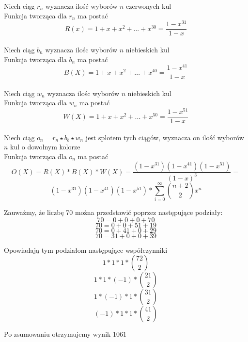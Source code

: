 \documentclass{mwart}
\begin{document}
\begin{mdframed}
    Niech ciąg $r_n$ wyznacza ilość wyborów $n$ czerwonych kul\\
    Funkcja tworząca dla $r_n$ ma postać \\
    $$R(x) = 1 + x + x^2 + ... + x^{30} = \frac{1-x^{31}}{1-x}$$\\

    Niech ciąg $b_n$ wyznacza ilośc wyborów $n$ niebieskich kul\\
    Funkcja tworząca dla $b_n$ ma postać \\
    $$B(X) = 1 + x + x^2 + ... + x^{40} = \frac{1-x^{41}}{1-x}$$\\

    Niech ciąg $w_n$ wyznacza ilośc wyborów $n$ niebieskich kul\\
    Funkcja tworząca dla $w_n$ ma postać \\
    $$W(X) = 1 + x + x^2 + ... + x^{50} = \frac{1-x^{51}}{1-x}$$\\

    Niech ciąg $o_n = r_n \star b_b \star w_n$ jest splotem tych ciągów, wyznacza on ilość wyborów $n$ kul o dowolnym kolorze\\
    Funkcja tworząca dla $o_n$ ma postać\\
    $$O(X) = R(X)*B(X)*W(X) = \frac{(1-x^{31})(1-x^{41})(1-x^{51})}{(1-x)^3} =$$
    $$(1-x^{31})(1-x^{41})(1-x^{51}) * \sum_{i=0}^{\infty}\binom{n+2}{2}x^n$$

    Zauważmy, że liczbę 70 można przedstawić poprzez następujące podziały:\\

    $$70 = 0 + 0 + 0 + 70$$
    $$70 = 0 + 0 + 51 + 19$$
    $$70 = 0 + 41 + 0 + 29$$
    $$70 = 31 + 0 + 0 + 39$$

    Opowiadają tym podziałom następujące współczynniki\\

    $$1*1*1*\binom{72}{2}$$
    $$1*1*(-1)*\binom{21}{2}$$
    $$1*(-1)*1*\binom{31}{2}$$
    $$(-1)*1*1*\binom{41}{2}$$

    Po zsumowaniu otrzymujemy wynik $1061$\\

\end{mdframed}
\end{document}

